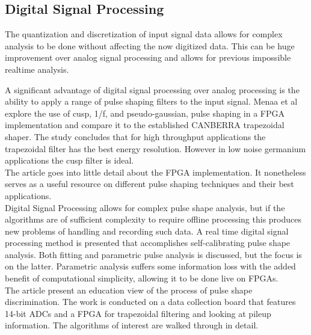 \documentclass[12pt]{article}
\begin{document}
\begin{doublespacing}
\pagebreak
\section{Digital Signal Processing}   %
The quantization and discretization of input signal data allows for complex analysis to be done without affecting the now digitized data. This can be huge improvement over analog signal processing and allows for previous impossible realtime analysis.
\\[20pt]


{\large\textbf{\cite{Menaa2011512}}}

A significant advantage of digital signal processing over analog processing is the ability to apply a range of pulse shaping filters to the input signal. Menaa et al explore the use of cusp, 1/f, and pseudo-gaussian, pulse shaping in a FPGA implementation and compare it to the established CANBERRA trapezoidal shaper. The study concludes that for high throughput applications the trapezoidal filter has the best energy resolution. However in low noise germanium applications the cusp filter is ideal.
\\
The article goes into little detail about the FPGA implementation. It nonetheless serves as a useful resource on different pulse shaping techniques and their best applications.
\\[20pt]


{\large\textbf{\cite{Suarez2008276}}}
Digital Signal Processing allows for complex pulse shape analysis, but if the algorithms are of sufficient complexity to require offline processing this produces new problems of handling and recording such data. A real time digital signal processing method is presented that accomplishes self-calibrating pulse shape analysis. Both fitting and parametric pulse analysis is discussed, but the focus is on the latter. Parametric analysis suffers some information loss with the added benefit of computational simplicity, allowing it to be done live on FPGAs.
\\
The article present an education view of the process of pulse shape discrimination. The work is conducted on a data collection board that features 14-bit ADCs and a FPGA for trapezoidal filtering and looking at pileup information. The algorithms of interest are walked through in detail.
\\[20pt]



\end{doublespacing}
\end{document}

